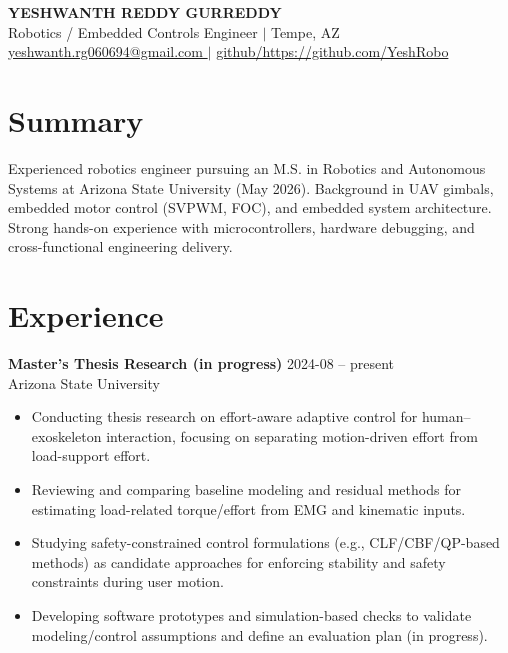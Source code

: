 \documentclass[11pt]{article}
\begin{document}
\begin{center}
  {\LARGE \textbf{ YESHWANTH REDDY GURREDDY }}\\[4pt]
  Robotics / Embedded Controls Engineer \quad $\vert$ \quad Tempe, AZ\\[2pt]
  \href{mailto:yeshwanth.rg060694@gmail.com}{ yeshwanth.rg060694@gmail.com } \quad $\vert$ \quad \href{https://github.com/https://github.com/YeshRobo}{github/https://github.com/YeshRobo}
\end{center}

\vspace{6pt}
\noindent\hrulefill

\vspace{6pt}
\section*{Summary}
Experienced robotics engineer pursuing an M.S. in Robotics and Autonomous Systems at Arizona State University (May 2026). Background in UAV gimbals, embedded motor control (SVPWM, FOC), and embedded system architecture. Strong hands-on experience with microcontrollers, hardware debugging, and cross-functional engineering delivery.

\section*{Experience}

\textbf{ Master's Thesis Research (in progress) } \hfill 2024-08 -- present\\
Arizona State University \\

\begin{itemize}[leftmargin=*,noitemsep]
  
  \item Conducting thesis research on effort-aware adaptive control for human–exoskeleton interaction, focusing on separating motion-driven effort from load-support effort.
  
  \item Reviewing and comparing baseline modeling and residual methods for estimating load-related torque/effort from EMG and kinematic inputs.
  
  \item Studying safety-constrained control formulations (e.g., CLF/CBF/QP-based methods) as candidate approaches for enforcing stability and safety constraints during user motion.
  
  \item Developing software prototypes and simulation-based checks to validate modeling/control assumptions and define an evaluation plan (in progress).
  
\end{itemize}
\end{document}
